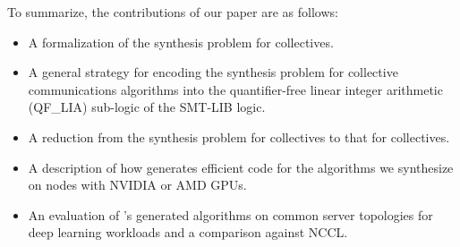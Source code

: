 To summarize, the contributions of our paper are as follows:
\begin{itemize}
    \item A formalization of the synthesis problem for \broadcasting collectives.
    \item A general strategy for encoding the synthesis problem for
    collective communications algorithms into the quantifier-free linear integer
    arithmetic (QF\_LIA) sub-logic of the SMT-LIB logic.
    \item A reduction from the synthesis problem for \reducing collectives to that for \broadcasting collectives.
    \item A description of how \tool{} generates efficient code for the algorithms we synthesize on nodes with NVIDIA or AMD GPUs.
    \item An evaluation of \tool's generated algorithms on common server topologies for deep learning workloads and a comparison against NCCL.
\end{itemize}


